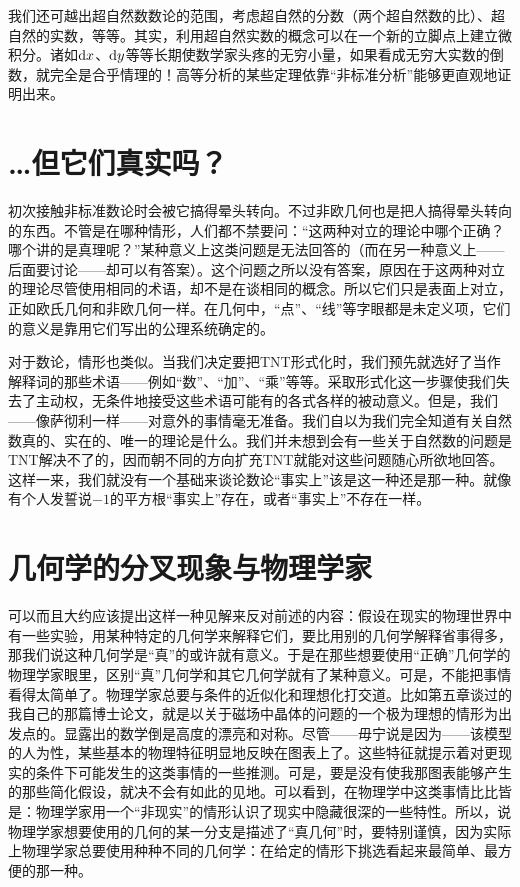 我们还可越出超自然数数论的范围，考虑超自然的分数（两个超自然数的比）、超自然的实数，等等。其实，利用超自然实数的概念可以在一个新的立脚点上建立微积分。诸如$\mathop { } \! \mathrm { d } x$、$\mathop { } \! \mathrm { d } y$等等长期使数学家头疼的无穷小量，如果看成无穷大实数的倒数，就完全是合乎情理的！高等分析的某些定理依靠“非标准分析”能够更直观地证明出来。

\section{…但它们真实吗？}

初次接触非标准数论时会被它搞得晕头转向。不过非欧几何也是把人搞得晕头转向的东西。不管是在哪种情形，人们都不禁要问：“这两种对立的理论中哪个正确？哪个讲的是真理呢？”某种意义上这类问题是无法回答的（而在另一种意义上——后面要讨论——却可以有答案）。这个问题之所以没有答案，原因在于这两种对立的理论尽管使用相同的术语，却不是在谈相同的概念。所以它们只是表面上对立，正如欧氏几何和非欧几何一样。在几何中，“点”、“线”等字眼都是未定义项，它们的意义是靠用它们写出的公理系统确定的。

对于数论，情形也类似。当我们决定要把TNT形式化时，我们预先就选好了当作解释词的那些术语——例如“数”、“加”、“乘”等等。采取形式化这一步骤使我们失去了主动权，无条件地接受这些术语可能有的各式各样的被动意义。但是，我们——像萨彻利一样——对意外的事情毫无准备。我们自以为我们完全知道有关自然数真的、实在的、唯一的理论是什么。我们并未想到会有一些关于自然数的问题是TNT解决不了的，因而朝不同的方向扩充TNT就能对这些问题随心所欲地回答。这样一来，我们就没有一个基础来谈论数论“事实上”该是这一种还是那一种。就像有个人发誓说$-1$的平方根“事实上”存在，或者“事实上”不存在一样。

\section{几何学的分叉现象与物理学家}

可以而且大约应该提出这样一种见解来反对前述的内容：假设在现实的物理世界中有一些实验，用某种特定的几何学来解释它们，要比用别的几何学解释省事得多，那我们说这种几何学是“真”的或许就有意义。于是在那些想要使用“正确”几何学的物理学家眼里，区别“真”几何学和其它几何学就有了某种意义。可是，不能把事情看得太简单了。物理学家总要与条件的近似化和理想化打交道。比如第五章谈过的我自己的那篇博士论文，就是以关于磁场中晶体的问题的一个极为理想的情形为出发点的。显露出的数学倒是高度的漂亮和对称。尽管——毋宁说是因为——该模型的人为性，某些基本的物理特征明显地反映在图表上了。这些特征就提示着对更现实的条件下可能发生的这类事情的一些推测。可是，要是没有使我那图表能够产生的那些简化假设，就决不会有如此的见地。可以看到，在物理学中这类事情比比皆是：物理学家用一个“非现实”的情形认识了现实中隐藏很深的一些特性。所以，说物理学家想要使用的几何的某一分支是描述了“真几何”时，要特别谨慎，因为实际上物理学家总要使用种种不同的几何学：在给定的情形下挑选看起来最简单、最方便的那一种。

